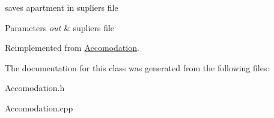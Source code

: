saves apartment in supliers file 


\begin{DoxyParams}{Parameters}
{\em out} & supliers file \\
\hline
\end{DoxyParams}


Reimplemented from \hyperlink{class_accomodation_a4394eb907b2d5a23faf73dd03c1dac4d}{Accomodation}.



The documentation for this class was generated from the following files\+:\begin{DoxyCompactItemize}
\item 
Accomodation.\+h\item 
Accomodation.\+cpp\end{DoxyCompactItemize}
